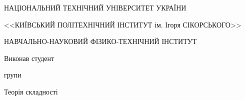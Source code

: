 \thispagestyle{empty}

\begin{center}
НАЦІОНАЛЬНИЙ ТЕХНІЧНИЙ УНІВЕРСИТЕТ УКРАЇНИ \par
<<КИЇВСЬКИЙ ПОЛІТЕХНІЧНИЙ ІНСТИТУТ ім. Ігоря СІКОРСЬКОГО>>\par
НАВЧАЛЬНО-НАУКОВИЙ ФІЗИКО-ТЕХНІЧНИЙ ІНСТИТУТ\par

\huge\MakeUppercase{\textbf{\reportTitle}} \par
\end{center}

\vspace{40mm}
\begin{flushright}
Виконав студент

групи \reportAuthorGroup

\reportAuthor
\end{flushright}

\vspace{20mm}
\begin{center}
{Теорія складності}
\end{center}

\newpage
\thispagestyle{plain}
